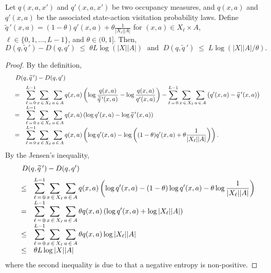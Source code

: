 \documentclass[12pt, final]{l4dc2023}
\begin{document}
\begin{lemma}\label{lem.D_difference}
	Let $q(x,a,x')$ and $q'(x,a,x')$ be two occupancy measures, and $q(x,a)$ and $q'(x,a)$ be the associated state-action visitation probability laws. 
	Define $\tilde{q}{\,'}(x,a) = (1-\theta)q'(x,a)+\theta \frac{1}{|X_\ell||A|}$ for $(x,a)\in X_\ell\times A$, $\ell\in\{0,1,\ldots,L-1 \}$, and $\theta\in (0,1]$. Then,
	\[
	D(q,\tilde{q}{\,'}) -  D(q,q') \;\leq\; \theta L\log (|X||A|)
	\;\text{ and }\;
	D(q,\tilde{q}{\,'}) \;\leq\; L\log(|X||A|/\theta).
	\]
\end{lemma}
\begin{proof}
	By the definition,
	\[
	\begin{array}{rcl}
	&&  \!\!\!\! \!\!\!\! \!\! 
	D(q,\tilde{q}{\,'}) -  D(q, q') 
	\\[0.2cm]
	& = & 
	\displaystyle
	\sum_{\ell\,=\,0}^{L-1} \sum_{x\,\in\,X_\ell} \sum_{a\,\in\,A} q(x,a) \rbr{\log\frac{q(x,a)}{\tilde q{\,'}(x,a)} -  \log\frac{q(x,a)}{ q'(x,a)}}
	-
	\sum_{\ell\,=\,0}^{L-1} \sum_{x\,\in\,X_\ell} \sum_{a\,\in\,A}  \big(q'(x,a)-\tilde{q}{\,'}(x,a)\big)
	\\[0.2cm]
	& = & 
	\displaystyle
	\sum_{\ell\,=\,0}^{L-1} \sum_{x\,\in\,X_\ell} \sum_{a\,\in\,A} q(x,a) \rbr{\log{ q'(x,a)}  -  \log{\tilde q{\,'}(x,a)} }
	\\[0.2cm]
	& = & 
	\displaystyle
	\sum_{\ell\,=\,0}^{L-1} \sum_{x\,\in\,X_\ell} \sum_{a\,\in\,A} q(x,a) \rbr{\log{ q'(x,a)}  -  \log\rbr{(1-\theta) q'(x,a) + \theta\frac{1}{|X_\ell||A|}} }.
	\end{array}
	\]
	By the Jensen's inequality,	
	\[
	\begin{array}{rcl}
	&& \!\!\!\! \!\!\!\! \!\! 
	D(q,\tilde{q}{\,'}) -  D(q, q') 
	\\[0.2cm]
	& \leq & 
	\displaystyle
	\sum_{\ell\,=\,0}^{L-1} \sum_{x\,\in\,X_\ell} \sum_{a\,\in\,A} q(x,a) \rbr{\log{ q'(x,a)}  -  (1-\theta)\log q'(x,a)  - \theta \log{ \frac{1}{|X_\ell||A|}} }
	\\[0.2cm]
	& = & 
	\displaystyle
	\sum_{\ell\,=\,0}^{L-1} \sum_{x\,\in\,X_\ell} \sum_{a\,\in\,A} \theta q(x,a) \rbr{\log{ q'(x,a)} +  \log{|X_\ell||A|} }
	\\[0.2cm]
	& \leq  & 
	\displaystyle
	\sum_{\ell\,=\,0}^{L-1} \sum_{x\,\in\,X_\ell}  \sum_{a\,\in\,A} \theta q(x,a)  \log{|X_\ell||A|}
	\\[0.2cm]
	& \leq  & 
	\displaystyle \theta L \log |X||A|
	\end{array}
	\]
	where the second inequality is due to that a negative entropy is non-positive. 
	

\end{proof}
\end{document}
